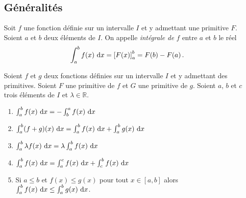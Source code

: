       \subsection{G\'en\'eralit\'es}
	      \begin{defi}
	      Soit $f$ une fonction d\'efinie sur un intervalle $I$ et y admettant une primitive $F$.
	      Soient $a$ et $b$ deux \'el\'ements de $I$.
	      On appelle \emph{int\'egrale de $f$} entre $a$ et $b$ le r\'eel 
	            \[
	            \int_{a}^{b} f(x) ~\mathrm{d}x = \left[ F(x) \right]_{a}^{b} = F(b) - F(a)      \,.
	            \]
	      \end{defi}
	      \begin{thm}
	      Soient $f$ et $g$ deux fonctions d\'efinies sur un intervalle $I$ et y admettant des primitives.
	      Soient $F$ une primitive de $f$ et $G$ une primitive de $g$.
	      Soient $a$, $b$ et $c$ trois \'el\'ements de $I$ et $\lambda \in \mathbb{R}$.
	            \begin{enumerate}
	                  \item $\int_{a}^{b} f(x) ~\mathrm{d}x = -\int_{b}^{a} f(x) ~\mathrm{d}x$
	                  \item $\int_{a}^{b} (f+g) (x) ~\mathrm{d}x = \int_{a}^{b} f(x) ~\mathrm{d}x + \int_{a}^{b} g(x) ~\mathrm{d}x$
	                  \item $\int_{a}^{b} \lambda f(x) ~\mathrm{d}x = \lambda \int_{a}^{b} f(x) ~\mathrm{d}x$
	                  \item $\int_{a}^{b} f(x) ~\mathrm{d}x = \int_{a}^{c} f(x) ~\mathrm{d}x + \int_{c}^{b} f(x) ~\mathrm{d}x$
	                  \item Si $a \leq b$ et $f(x) \leq g(x)$ pour tout $x\in [a,b]$ alors 
	                        $\int_{a}^{b} f(x) ~\mathrm{d}x \leq \int_{a}^{b} g(x) ~\mathrm{d}x$.            
	            \end{enumerate}
	      \end{thm}
